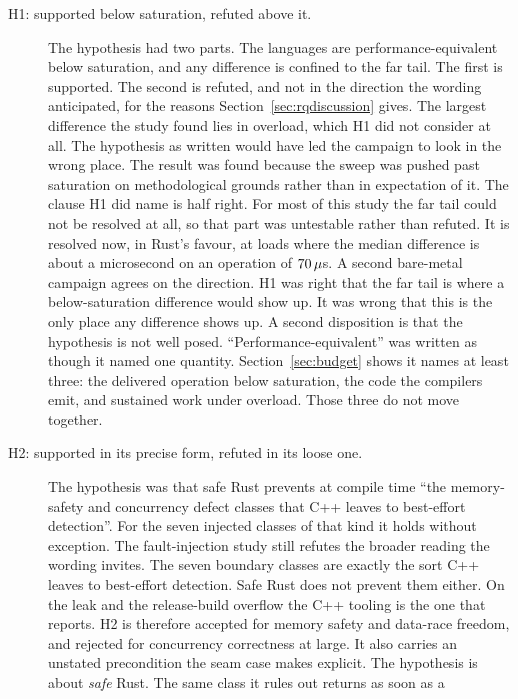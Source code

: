 \documentclass[english,oneside,a4paper,censored,csm,software-track-2020]{HYthesisML}
\begin{document}
\begin{description}
  \item[H1: supported below saturation, refuted above it.]
        The hypothesis had two parts. The languages are performance-equivalent below saturation,
        and any difference is confined to the far tail. The first is supported. The second is
        refuted, and not in the direction the wording anticipated, for the reasons
        Section~\ref{sec:rqdiscussion} gives. The largest difference the study found lies in
        overload, which H1 did not consider at all. The hypothesis as written would have led the
        campaign to look in the wrong place. The result was found because the sweep was pushed past
        saturation on methodological grounds rather than in expectation of it. The clause H1 did
        name is half right. For most of this study the far tail could not be resolved at all, so
        that part was untestable rather than refuted. It is resolved now, in Rust's favour, at
        loads where the median difference is about a microsecond on an operation of
        $70\,\mu$s. A second bare-metal campaign agrees on the direction. H1 was right
        that the far tail is where a below-saturation difference would show up. It was wrong that
        this is the only place any difference shows up. A second disposition is that the
        hypothesis is not well posed. ``Performance-equivalent'' was written as though it named
        one quantity. Section~\ref{sec:budget} shows it names at least three: the delivered
        operation below saturation, the code the compilers emit, and sustained work under
        overload. Those three do not move together.
  \item[H2: supported in its precise form, refuted in its loose one.] The hypothesis was
        that safe Rust prevents at compile time ``the memory-safety and concurrency defect
        classes that C++ leaves to best-effort detection''. For the seven injected classes of
        that kind it holds without exception. The fault-injection study still refutes the broader
        reading the wording invites. The seven boundary classes are exactly the sort C++ leaves
        to best-effort detection. Safe Rust does not prevent them either. On the leak and the
        release-build overflow the C++ tooling is the one that reports. H2 is therefore accepted
        for memory safety and data-race freedom, and rejected for concurrency correctness at
        large. It also carries an unstated precondition the seam case makes explicit. The
        hypothesis is about \emph{safe} Rust. The same class it rules out returns as soon as a

\end{description}
\end{document}
